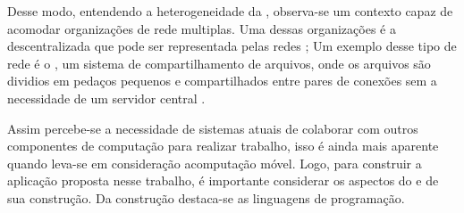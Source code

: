 Desse modo, entendendo a heterogeneidade da , observa-se um contexto capaz de acomodar organizações de rede multiplas. Uma dessas organizações é a descentralizada que pode ser representada pelas redes  \cite{tanenbaum2007dist}; Um exemplo desse tipo de rede é o , um sistema de compartilhamento de arquivos, onde os arquivos são dividios em pedaços pequenos e compartilhados entre pares de conexões sem a necessidade de um servidor central \cite{guo2007performance}.

Assim percebe-se a necessidade de sistemas atuais de colaborar com outros componentes de computação para realizar trabalho, isso é ainda mais aparente quando leva-se em consideração acomputação móvel. Logo, para construir a aplicação proposta nesse trabalho, é importante considerar os aspectos do  e de sua construção. Da construção destaca-se as linguagens de programação.
